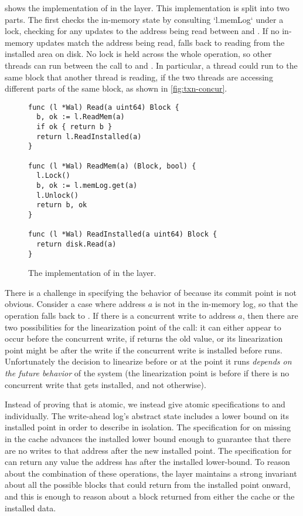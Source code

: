  shows the implementation of  in the
 layer.  This implementation is split into two parts. The first checks
the in-memory state by consulting `l.memLog` under a lock, checking for any
updates to the address being read between  and . If
no in-memory updates match the address being read,  falls back
to reading from the installed area on disk.  No lock is held across the whole
operation, so other threads
can run between the call to  and .
In particular, a thread could run 
to the same block that another thread is reading, if the two threads
are accessing different parts of the same block, as shown in \cref{fig:txn-concur}.

\begin{figure}[ht]
\begin{verbatim}
func (l *Wal) Read(a uint64) Block {
  b, ok := l.ReadMem(a)
  if ok { return b }
  return l.ReadInstalled(a)
}

func (l *Wal) ReadMem(a) (Block, bool) {
  l.Lock()
  b, ok := l.memLog.get(a)
  l.Unlock()
  return b, ok
}

func (l *Wal) ReadInstalled(a uint64) Block {
  return disk.Read(a)
}
\end{verbatim}
\caption{The implementation of  in the  layer.}
\label{fig:walread}
\end{figure}

There is a challenge in specifying the behavior of  because its commit
point is not obvious.  Consider a case
where address $a$ is not in the in-memory log, so that the  operation
falls back to . If there is a concurrent write to address
$a$, then there are two possibilities for the linearization point of the
 call: it can either appear to occur before the concurrent write, if
 returns the old value, or its linearization point might be
after the write if the concurrent write is installed before
 runs. Unfortunately the decision to linearize before
 or at the point it runs \emph{depends on the future
  behavior} of the system (the linearization point is before if there is no
concurrent write that gets installed, and not otherwise).

Instead of proving that  is atomic, we instead give atomic specifications to
 and  individually. The write-ahead log's
abstract state includes a lower bound on its installed point in order to
describe  in isolation. The specification for 
on missing in the cache
advances the installed lower bound enough to guarantee that there are no writes
to that address after the new installed point. The specification for
 can return any value the address has after the
installed lower-bound. To reason about the combination of these operations, the
 layer maintains a strong invariant about all the possible blocks that
 could return from the installed point onward, and this is enough to
reason about a block returned from either the cache or the installed data.

